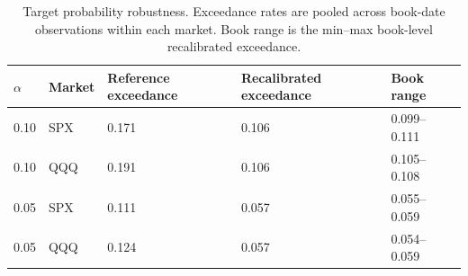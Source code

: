 \begin{table}
\caption{Target probability robustness. Exceedance rates are pooled across book-date observations within each market. Book range is the min--max book-level recalibrated exceedance.}
\label{tab:alpha_robustness_generated}
\begin{tabular}{lllll}
\toprule
$\alpha$ & Market & Reference exceedance & Recalibrated exceedance & Book range \\
\midrule
0.10 & SPX & 0.171 & 0.106 & 0.099--0.111 \\
0.10 & QQQ & 0.191 & 0.106 & 0.105--0.108 \\
0.05 & SPX & 0.111 & 0.057 & 0.055--0.059 \\
0.05 & QQQ & 0.124 & 0.057 & 0.054--0.059 \\
\bottomrule
\end{tabular}
\end{table}
